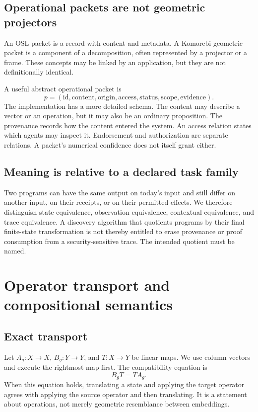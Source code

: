 \documentclass[11pt]{article}
\begin{document}
\subsection{Operational packets are not geometric projectors}
An OSL packet is a record with content and metadata. A Komorebi geometric packet is a component of a decomposition, often represented by a projector or a frame. These concepts may be linked by an application, but they are not definitionally identical.

A useful abstract operational packet is
\[
 p=(\mathrm{id},\mathrm{content},\mathrm{origin},\mathrm{access},\mathrm{status},\mathrm{scope},\mathrm{evidence}).
\]
The implementation has a more detailed schema. The content may describe a vector or an operation, but it may also be an ordinary proposition. The provenance records how the content entered the system. An access relation states which agents may inspect it. Endorsement and authorization are separate relations. A packet's numerical confidence does not itself grant either.

\subsection{Meaning is relative to a declared task family}
Two programs can have the same output on today's input and still differ on another input, on their receipts, or on their permitted effects. We therefore distinguish state equivalence, observation equivalence, contextual equivalence, and trace equivalence. A discovery algorithm that quotients programs by their final finite-state transformation is not thereby entitled to erase provenance or proof consumption from a security-sensitive trace. The intended quotient must be named.

\section{Operator transport and compositional semantics}
\subsection{Exact transport}
Let \(A_g:X\to X\), \(B_g:Y\to Y\), and \(T:X\to Y\) be linear maps. We use column vectors and execute the rightmost map first. The compatibility equation is
\begin{equation}\label{eq:intertwine}
 B_gT=TA_g.
\end{equation}
When this equation holds, translating a state and applying the target operator agrees with applying the source operator and then translating. It is a statement about operations, not merely geometric resemblance between embeddings.
\end{document}
